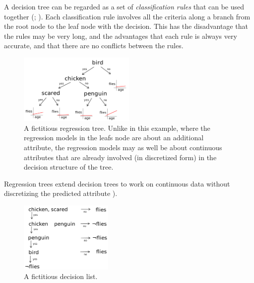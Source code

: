 A decision tree can be regarded as a set of \textit{classification rules} that can be used together (\citet[ch.~3.4]{wittenDataMiningPractical2017}; \citet[p.~358]{hanDataMiningConcepts2011}). Each classification rule involves all the criteria along a branch from the root node to the leaf node with the decision. This has the disadvantage that the rules may be very long, and the advantages that each rule is always very accurate, and that there are no conflicts between the rules.


\begin{figure}[htb]
        \centering
        \includegraphics[width=0.5\textwidth]{images/regression-tree.png}
        \caption{A fictitious regression tree. Unlike in this example, where the regression models in the leafs node are about an additional attribute, the regression models may as well be about continuous attributes that are already involved (in discretized form) in the decision structure of the tree.}
        \label{fig:regression-list}
\end{figure}

Regression trees extend decision trees to work on continuous data without discretizing the predicted attribute \citep[p.~72ff.]{wittenDataMiningPractical2017}).

\label{sec:decision-lists}

\begin{figure}[htb]
        \centering
        \includegraphics[width=0.4\textwidth]{images/decision-list.png}
        \caption{A fictitious decision list.}
        \label{fig:decision-list}
\end{figure}

